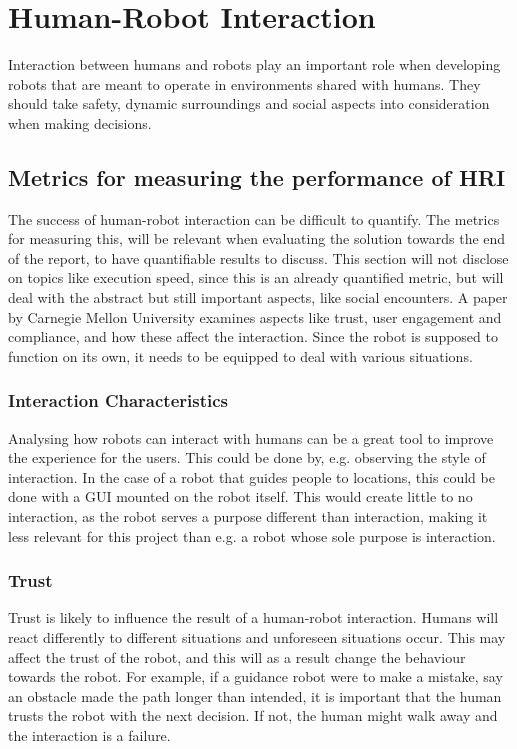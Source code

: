 \chapter{Human-Robot Interaction}\label{ch:HRI}
Interaction between humans and robots play an important role when developing robots that are meant to operate in environments shared with humans. They should take safety, dynamic surroundings and social aspects into consideration when making decisions.

\section{Metrics for measuring the performance of HRI}
The success of human-robot interaction can be difficult to quantify. The metrics for measuring this, will be relevant when evaluating the solution towards the end of the report, to have quantifiable results to discuss. This section will not disclose on topics like execution speed, since this is an already quantified metric, but will deal with the abstract but still important aspects, like social encounters. A paper by Carnegie Mellon University \cite{HRIMetrics} examines aspects like trust, user engagement and compliance, and how these affect the interaction. Since the robot is supposed to function on its own, it needs to be equipped to deal with various situations.
\subsection{Interaction Characteristics}
Analysing how robots can interact with humans can be a great tool to improve the experience for the users. This could be done by, e.g. observing the style of interaction. In the case of a robot that guides people to locations, this could be done with a GUI mounted on the robot itself. This would create little to no interaction, as the robot serves a purpose different than interaction, making it less relevant for this project than e.g. a robot whose sole purpose is interaction.
\subsection{Trust}
Trust is likely to influence the result of a human-robot interaction. Humans will react differently to different situations and unforeseen situations occur. This may affect the trust of the robot, and this will as a result change the behaviour towards the robot. For example, if a guidance robot were to make a mistake, say an obstacle made the path longer than intended, it is important that the human trusts the robot with the next decision. If not, the human might walk away and the interaction is a failure.

